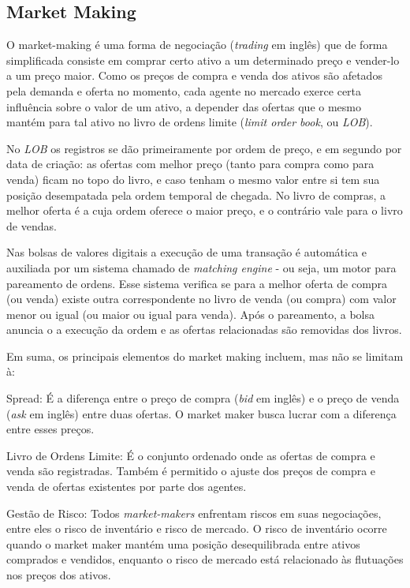 \subsection{Market Making}
O market-making é uma forma de negociação (\textit{trading} em inglês)  que de forma simplificada consiste em comprar certo ativo a um determinado preço e vender-lo a um preço maior.
Como os preços de compra e venda dos ativos são afetados pela demanda e oferta no momento, cada agente no mercado exerce certa influência sobre o valor de um ativo, a depender das ofertas que o mesmo mantém para tal ativo no livro de ordens limite (\textit{limit order book}, ou \textit{LOB}). 

No \textit{LOB} os registros se dão primeiramente por ordem de preço, e em segundo por data de criação: as ofertas com melhor preço (tanto para compra como para venda) ficam no topo do livro, e caso tenham o mesmo valor entre si tem sua posição desempatada pela ordem temporal de chegada. No livro de compras, a melhor oferta é a cuja ordem oferece o maior preço, e o contrário vale para o livro de vendas.

Nas bolsas de valores digitais a execução de uma transação é automática e auxiliada por um sistema chamado de \textit{matching engine} - ou seja, um motor para pareamento de ordens. Esse sistema verifica se para a melhor oferta de compra (ou venda) existe outra correspondente no livro de venda (ou compra) com valor menor ou igual (ou maior ou igual para venda). Após o pareamento, a bolsa anuncia o a execução da ordem e as ofertas relacionadas são removidas dos livros.

Em suma, os principais elementos do market making incluem, mas não se limitam à:

Spread: É a diferença entre o preço de compra (\textit{bid} em inglês) e o preço de venda (\textit{ask} em inglês) entre duas ofertas. O market maker busca lucrar com a diferença entre esses preços.

Livro de Ordens Limite: É o conjunto ordenado onde as ofertas de compra e venda são registradas. Também é permitido o ajuste dos preços de compra e venda de ofertas existentes por parte dos agentes.

Gestão de Risco: Todos \textit{market-makers} enfrentam riscos em suas negociações, entre eles o risco de inventário e risco de mercado. O risco de inventário ocorre quando o market maker mantém uma posição desequilibrada entre ativos comprados e vendidos, enquanto o risco de mercado está relacionado às flutuações nos preços dos ativos.

